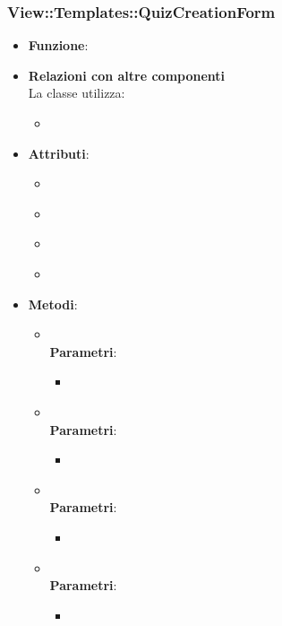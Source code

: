 \subsubsection{View::Templates::QuizCreationForm}
\begin{itemize}
\item\textbf{Funzione}:
\item\textbf{Relazioni con altre componenti}\\
La classe utilizza:
	\begin{itemize}
		\item
	\end{itemize}
\item\textbf{Attributi}:
	\begin{itemize}
		\item\code{}\\
		\item\code{}\\
		\item\code{}\\
		\item\code{}\\
	\end{itemize}
\item\textbf{Metodi}:
	\begin{itemize}
		\item\code{}\\
		\textbf{Parametri}:
			\begin{itemize}
				\item\code{}\\
			\end{itemize}
		\item\code{}\\
		\textbf{Parametri}:
			\begin{itemize}
				\item\code{}\\
			\end{itemize}
		\item\code{}\\
		\textbf{Parametri}:
			\begin{itemize}
				\item\code{}\\
			\end{itemize}
		\item\code{}\\
		\textbf{Parametri}:
			\begin{itemize}
				\item\code{}\\
			\end{itemize}
	\end{itemize}
\end{itemize}


